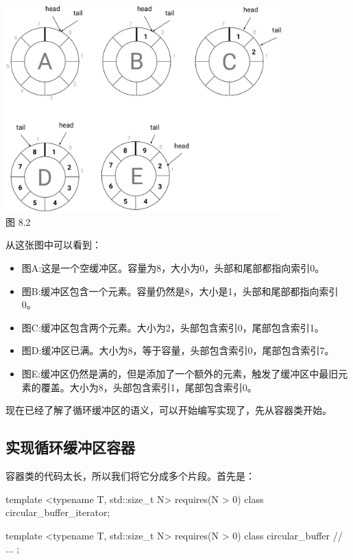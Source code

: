 \begin{center}
\includegraphics[width=0.8\textwidth]{images/2.png}\\
图 8.2
\end{center}

从这张图中可以看到：

\begin{itemize}
\item
图A:这是一个空缓冲区。容量为8，大小为0，头部和尾部都指向索引0。

\item
图B:缓冲区包含一个元素。容量仍然是8，大小是1，头部和尾部都指向索引0。

\item
图C:缓冲区包含两个元素。大小为2，头部包含索引0，尾部包含索引1。

\item
图D:缓冲区已满。大小为8，等于容量，头部包含索引0，尾部包含索引7。

\item
图E:缓冲区仍然是满的，但是添加了一个额外的元素，触发了缓冲区中最旧元素的覆盖。大小为8，头部包含索引1，尾部包含索引0。
\end{itemize}

现在已经了解了循环缓冲区的语义，可以开始编写实现了，先从容器类开始。

\subsection{实现循环缓冲区容器}

容器类的代码太长，所以我们将它分成多个片段。首先是：

\begin{cpp}
template <typename T, std::size_t N>
	requires(N > 0)
class circular_buffer_iterator;

template <typename T, std::size_t N>
	requires(N > 0)
class circular_buffer
{
	// ...
};
\end{cpp}

